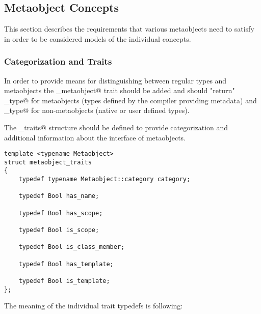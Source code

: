 \subsection{Metaobject Concepts}

This section describes the requirements that various metaobjects
need to satisfy in order to be considered models of the individual
concepts.

\subsubsection{Categorization and Traits}

In order to provide means for distinguishing between regular types
and metaobjects the \verb@is_metaobject@ trait should be added
and should "return" \verb@true_type@ for metaobjects (types defined
by the compiler providing metadata) and \verb@false_type@
for non-metaobjects (native or user defined types).

The \verb@metaobject_traits@ structure should be defined to provide
categorization and additional information about the interface of metaobjects.

\begin{lstlisting}
template <typename Metaobject>
struct metaobject_traits
{
	typedef typename Metaobject::category category;

	typedef Bool has_name;

	typedef Bool has_scope;

	typedef Bool is_scope;

	typedef Bool is_class_member;

	typedef Bool has_template;

	typedef Bool is_template;
};
\end{lstlisting}

The meaning of the individual trait typedefs is following:

